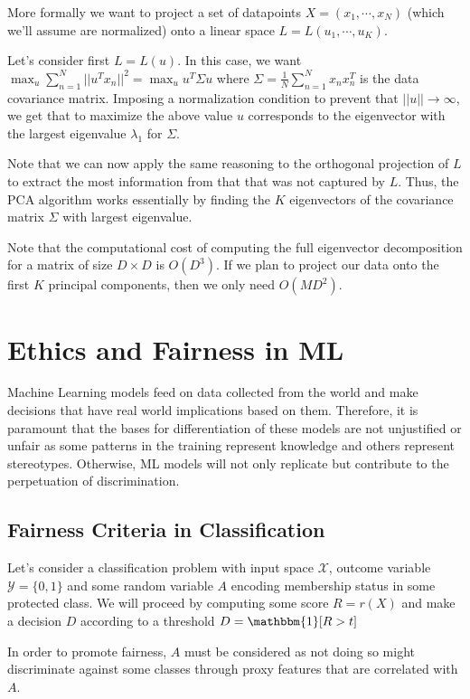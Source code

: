 \documentclass{article}
\newcommand{\ind}{\mathbbm{1}}
\begin{document}
More formally we want to project a set of datapoints $X = (x_1, \cdots, x_N)$ (which we'll assume are normalized) onto a linear space $L = L(u_1, \cdots, u_K)$.

Let's consider first $L = L(u)$. 
In this case, we want $\max_u \sum_{n=1}^N ||u^T x_n||^2 = \max_u u^T \Sigma u$ where $\Sigma = \frac{1}{N} \sum_{n=1}^N x_n x_n^T$ is the data covariance matrix.
Imposing a normalization condition to prevent that $||u|| \to \infty$, we get that to maximize the above value $u$ corresponds to the eigenvector with the largest eigenvalue $\lambda_1$ for $\Sigma$.

Note that we can now apply the same reasoning to the orthogonal projection of $L$ to extract the most information from that that was not captured by $L$.
Thus, the PCA algorithm works essentially by finding the $K$ eigenvectors of the covariance matrix $\Sigma$ with largest eigenvalue.

Note that the computational cost of computing the full eigenvector decomposition for a matrix of size $D \times D$ is $O(D^3)$.
If we plan to project our data onto the first $K$ principal components, then we only need $O(M D^2)$.

\section{Ethics and Fairness in ML}

Machine Learning models feed on data collected from the world and make decisions that have real world implications based on them.
Therefore, it is paramount that the bases for differentiation of these models are not unjustified or unfair as some patterns in the training represent knowledge and others represent stereotypes.
Otherwise, ML models will not only replicate but contribute to the perpetuation of discrimination.

\subsection{Fairness Criteria in Classification}

Let's consider a classification problem with input space $\mathcal{X}$, outcome variable $\mathcal{Y} = \{0,1\}$ and some random variable $A$ encoding membership status in some protected class.
We will proceed by computing some score $R = r(X)$ and make a decision $D$ according to a threshold $D = \ind[R>t]$

In order to promote fairness, $A$ must be considered as not doing so might discriminate against some classes through proxy features that are correlated with $A$.
\end{document}
